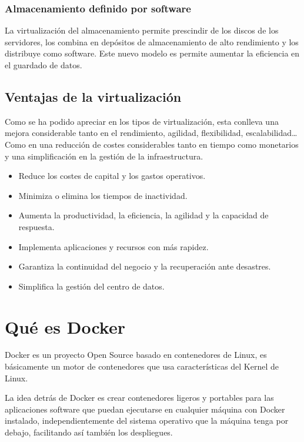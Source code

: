 \subsubsection{Almacenamiento definido por software}

La virtualización del almacenamiento permite prescindir de  los discos de los servidores, los combina en depósitos de almacenamiento de alto rendimiento y los distribuye como software. Este nuevo modelo es permite aumentar la eficiencia en el guardado de datos.
\pagebreak  

\subsection{Ventajas de la virtualización}

Como se ha podido apreciar en los tipos de virtualización, esta conlleva una mejora considerable tanto en el rendimiento, agilidad, flexibilidad, escalabilidad… Como en una reducción de costes considerables tanto en tiempo como monetarios y una simplificación en la gestión de la infraestructura.

\begin{itemize}
\item Reduce los costes de capital y los gastos operativos.
\item Minimiza o elimina los tiempos de inactividad.
\item Aumenta la productividad, la eficiencia, la agilidad y la capacidad de respuesta.
\item Implementa aplicaciones y recursos con más rapidez.
\item Garantiza la continuidad del negocio y la recuperación ante desastres.
\item Simplifica la gestión del centro de datos. 
\end{itemize}

\section{Qué es Docker}

Docker es un proyecto Open Source basado en contenedores de Linux, es básicamente un motor de contenedores que usa características del Kernel de Linux.

La idea detrás de Docker es crear contenedores ligeros y portables para las aplicaciones software que puedan ejecutarse en cualquier máquina con Docker instalado,
independientemente del sistema operativo que la máquina tenga por debajo, facilitando así también los despliegues.

